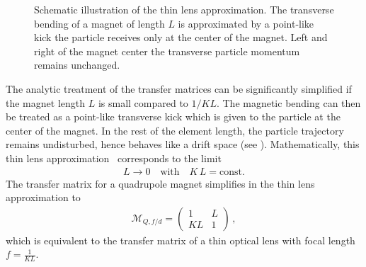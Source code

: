 \begin{figure}[b]  
  \centering
  \caption{Schematic illustration of the thin lens approximation. The transverse bending of a magnet of length $L$ is approximated by a point-like kick the particle receives only at the center of the magnet. Left and right of the magnet center the transverse particle momentum remains unchanged.}
  \label{pic:thinlens}
\end{figure}









The analytic treatment of the transfer matrices can be significantly simplified if the magnet length $L$ is small compared to $1/KL$. The magnetic bending can then be treated as a point-like transverse kick which is given to the particle at the center of the magnet. In the rest of the element length, the particle trajectory remains undisturbed, hence behaves like a drift space (see ). Mathematically, this thin lens approximation~\cite{CERN-SL-95-12} corresponds to the limit
\begin{align}
  L \rightarrow 0 \quad \text{with} \quad K \, L = \text{const.} 
\end{align} 
The transfer matrix for a quadrupole magnet simplifies in the thin lens approximation to
\begin{align}
  \mathcal{M}_{Q,f/d} = \begin{pmatrix}  1 & L \\   KL & 1  \end{pmatrix} \, ,
\end{align}
which is equivalent to the transfer matrix of a thin optical lens with focal length $f=\frac{1}{KL}$.
%

